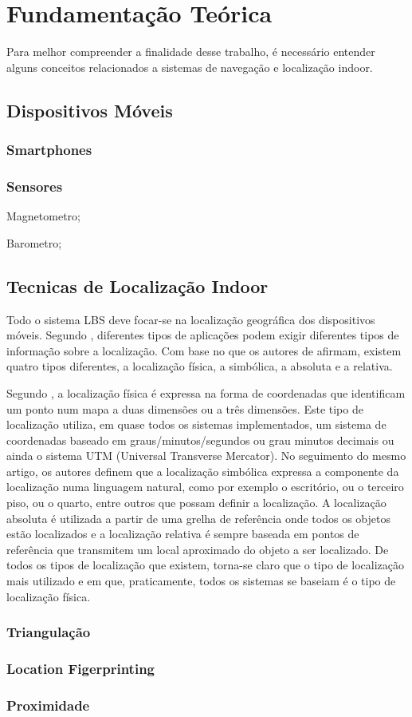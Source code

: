 \chapter{Fundamentação Teórica} \label{fundamentacao}
Para melhor compreender a finalidade desse trabalho, é necessário entender alguns conceitos relacionados a sistemas de navegação e localização indoor.

\section{Dispositivos Móveis}
\subsection{Smartphones}
\subsection{Sensores}
\begin{lista}
   \item Magnetometro;
   \item Barometro;
\end{lista}
\section{Tecnicas de Localização Indoor}
Todo o sistema LBS deve focar-se na localização geográfica dos dispositivos móveis.
Segundo \cite{surveywireless}, diferentes tipos de aplicações podem exigir diferentes tipos de informação sobre a localização. Com base no que os autores de  \cite{locationsystems} afirmam, existem quatro
tipos diferentes, a localização física, a simbólica, a absoluta e a relativa.

Segundo \cite{locationsystems}, a localização física é expressa na forma de coordenadas que identificam
um ponto num mapa a duas dimensões ou a três dimensões. Este tipo de localização utiliza, em quase todos os sistemas implementados, um sistema de coordenadas baseado em
graus/minutos/segundos ou grau minutos decimais ou ainda o sistema UTM (Universal
Transverse Mercator). No seguimento do mesmo artigo, os autores definem que a localização simbólica expressa a componente da localização numa linguagem natural, como
por exemplo o escritório, ou o terceiro piso, ou o quarto, entre outros que possam definir
a localização. A localização absoluta é utilizada a partir de uma grelha de referência onde
todos os objetos estão localizados e a localização relativa é sempre baseada em pontos de
referência que transmitem um local aproximado do objeto a ser localizado. De todos os
tipos de localização que existem, torna-se claro que o tipo de localização mais utilizado e
em que, praticamente, todos os sistemas se baseiam é o tipo de localização física.

\subsection{Triangulação}
\subsection{Location Figerprinting}
\subsection{Proximidade}



